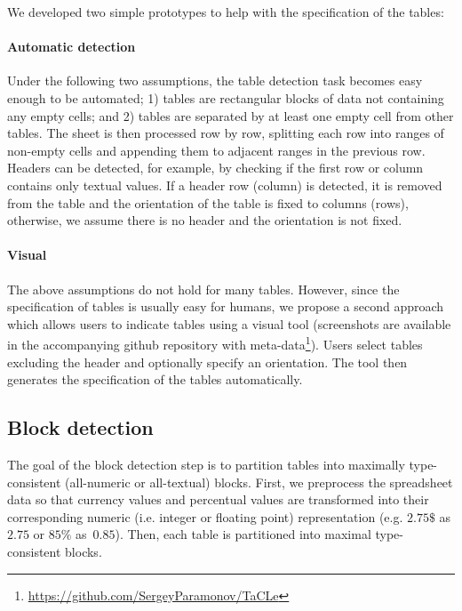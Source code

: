 We developed two simple prototypes to help with the specification of the tables:


\paragraph{Automatic detection}
Under the following two assumptions, the table detection task becomes easy enough to be automated; 1) tables are rectangular blocks of data not containing any empty cells; and 2) tables are separated by at least one empty cell from other tables.
The sheet is then processed row by row, splitting each row into ranges of non-empty cells and appending them to adjacent ranges in the previous row.
Headers can be detected, for example, by checking if the first row or column contains only textual values. If a header row (column) is detected, it is removed from the table and the orientation of the table is fixed to columns (rows), otherwise, we assume there is no header and the orientation is not fixed.

\paragraph{Visual}
The above assumptions do not hold for many tables. However, since the specification of tables is usually easy for humans, we propose a second approach which allows users to indicate tables using a visual tool (screenshots are available in the accompanying github repository with meta-data\footnote{\url{https://github.com/SergeyParamonov/TaCLe}\label{github-link}}).
Users select tables excluding the header and optionally specify an orientation.
The tool then generates the specification of the tables automatically.





\subsection{Block detection} \label{sec:make_groups}
The goal of the block detection step is to partition tables into maximally type-consistent (all-numeric or all-textual) blocks.
First, we preprocess the spreadsheet data so that currency values and percentual values are transformed into their corresponding numeric (i.e. integer or floating point) representation (e.g. $2.75 \$$ as $2.75$ or $85\%$ as~$0.85$).
Then, each table is partitioned into maximal type-consistent blocks.

